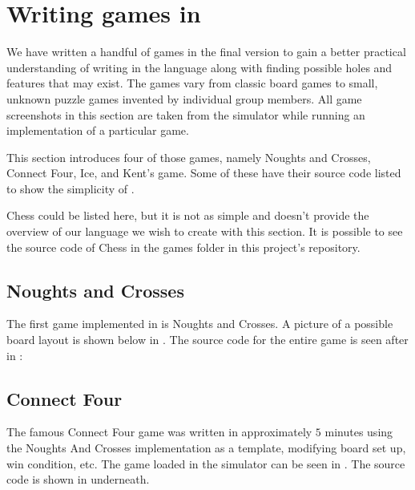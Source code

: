 \section{Writing games in \productname{}}
We have written a handful of games in the final version \productname{}
to gain a better practical understanding of writing in the language
along with finding possible holes and features that may exist. The games
vary from classic board games to small, unknown puzzle games invented by
individual group members. All game screenshots in this section are taken
from the simulator while running an implementation of a particular game.

This section introduces four of those games, namely Noughts and Crosses,
Connect Four, Ice, and Kent's game. Some of these have their source code
listed to show the simplicity of \productname{}.

Chess could be listed here, but it is not as simple and doesn't provide
the overview of our language we wish to create with this section. It is
possible to see the source code of Chess in the games folder in this
project's repository.

\subsection{Noughts and Crosses}
The first game implemented in \productname{} is Noughts and
Crosses. A picture of a possible board layout is shown below in
. The source code for the entire game is seen
after in :



\subsection{Connect Four}
The famous Connect Four game was written in approximately $5$ minutes
using the Noughts And Crosses implementation as a template, modifying
board set up, win condition, etc. The game loaded in the simulator can
be seen in . The source code is shown in
 underneath.



